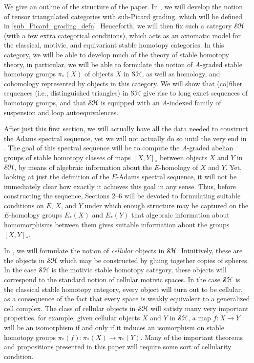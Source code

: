 \documentclass[../main.tex]{subfiles}
\begin{document}
We give an outline of the structure of the paper. In , we will develop the notion of tensor triangulated categories with sub-Picard grading, which will be defined in \autoref{sub_Picard_grading_defn}. Henceforth, we will then fix such a category $\mathcal{SH}$ (with a few extra categorical conditions), which acts as an axiomatic model for the classical, motivic, and equivariant stable homotopy categories. In this category, we will be able to develop much of the theory of stable homotopy theory, in particular, we will be able to formulate the notion of $A$-graded stable homotopy groups $\pi_*(X)$ of objects $X$ in $\mathcal{SH}$, as well as homology, and cohomology represented by objects in this category. We will show that (co)fiber sequences (i.e., distinguished triangles) in $\mathcal{SH}$ give rise to long exact sequences of homotopy groups, and that $\mathcal{SH}$ is equipped with an $A$-indexed family of suspension and loop autoequivalences.

After just this first section, we will actually have all the data needed to construct the Adams spectral sequence, yet we will not actually do so until the very end in . The goal of this spectral sequence will be to compute the $A$-graded abelian groups of stable homotopy classes of maps ${[X,Y]}_*$ between objects $X$ and $Y$ in $\mathcal{SH}$, by means of algebraic information about the $E$-homology of $X$ and $Y$. Yet, looking at just the definition of the $E$-Adams spectral sequence, it will not be immediately clear how exactly it achieves this goal in any sense. Thus, before constructing the sequence, Sections 2--6 will be devoted to formulating suitable conditions on $E$, $X$, and $Y$ under which enough structure may be captured on the $E$-homology groups $E_*(X)$ and $E_*(Y)$ that algebraic information about homomorphisms between them gives suitable information about the groups ${[X,Y]}_*$.

In , we will formulate the notion of \emph{cellular} objects in $\mathcal{SH}$. Intuitively, these are the objects in $\mathcal{SH}$ which may be constructed by gluing together copies of spheres. In the case $\mathcal{SH}$ is the motivic stable homotopy category, these objects will correspond to the standard notion of cellular motivic spaces. In the case $\mathcal{SH}$ is the classical stable homotopy category, every object will turn out to be cellular, as a consequence of the fact that every space is weakly equivalent to a generalized cell complex. The class of cellular objects in $\mathcal{SH}$ will satisfy many very important properties, for example, given cellular objects $X$ and $Y$ in $\mathcal{SH}$, a map $f:X\to Y$ will be an isomorphism if and only if it induces an isomorphism on stable homotopy groups $\pi_*(f):\pi_*(X)\to\pi_*(Y)$. Many of the important theorems and propositions presented in this paper will require some sort of cellularity condition.
\end{document}
